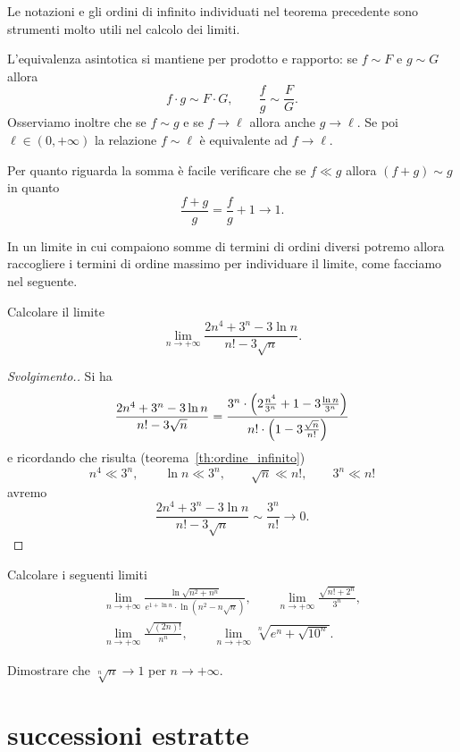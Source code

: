 Le notazioni e gli
ordini di infinito individuati nel teorema precedente
sono strumenti molto utili nel calcolo dei limiti.

L'equivalenza asintotica
si mantiene per prodotto e rapporto:
se $f\sim F$ e $g\sim G$ allora
\[
 f \cdot g \sim F \cdot G,
 \qquad
 \frac{f}{g} \sim \frac{F}{G}.
\]
Osserviamo inoltre che se
$f \sim g$ e se $f\to \ell$ allora
anche $g\to \ell$.
Se poi $\ell\in(0,+\infty)$
la relazione $f\sim \ell$ è equivalente ad $f\to \ell$.

Per quanto riguarda la somma
è facile verificare che se $f\ll g$ allora
$(f+g) \sim g$ in quanto
\[
  \frac{f + g}{g} = \frac{f}{g} + 1 \to 1.
\]

In un limite in cui compaiono somme di termini
di ordini diversi potremo allora raccogliere i termini di ordine
massimo per individuare il limite, come facciamo
nel seguente.

\begin{example}
Calcolare il limite
\[
\lim_{n\to+\infty}
\frac{2n^4 + 3^n - 3 \ln n}{n! - 3\sqrt n}.
\]
\end{example}
\begin{proof}[Svolgimento.]
Si ha
\[
\frac{2n^4 + 3^n - 3 \ln n}{n! - 3\sqrt{n}}
= \frac
{3^n \cdot {\left( 2\frac{n^4}{3^n}+ 1 - 3\frac{\ln n}{3^n} \right)}}
{n!\cdot {\left( 1-3\frac{\sqrt n}{n!} \right)}}
\]
e ricordando che risulta (teorema~\ref{th:ordine_infinito})
\[
n^4 \ll 3^n, \qquad
\ln n \ll 3^n, \qquad
\sqrt n \ll n!, \qquad
3^n \ll n!
\]
avremo
\[
\frac{2n^4 + 3^n - 3 \ln n}{n! - 3\sqrt{n}}
\sim \frac{3^n}{n!} \to 0.
\]
\end{proof}


\begin{exercise}
Calcolare i seguenti limiti
\begin{gather*}
  \lim_{n\to +\infty} \frac{\displaystyle \ln\sqrt{n^2+n^n}}
  {\displaystyle e^{1 + \ln n}\cdot \ln(n^2-n\sqrt n)}, \qquad
  \lim_{n\to +\infty} \frac{\sqrt{n! + 2^n}}{3^n}, \\
  \lim_{n\to +\infty} \frac{\sqrt{(2n)!}}{n^n}, \qquad
  \lim_{n\to +\infty} \sqrt[n]{e^n + \sqrt{10^n}}.
\end{gather*}
\end{exercise}

\begin{exercise}
  Dimostrare che $\sqrt[n]{n}\to 1$ per $n\to +\infty$.
\end{exercise}



\section{successioni estratte}

